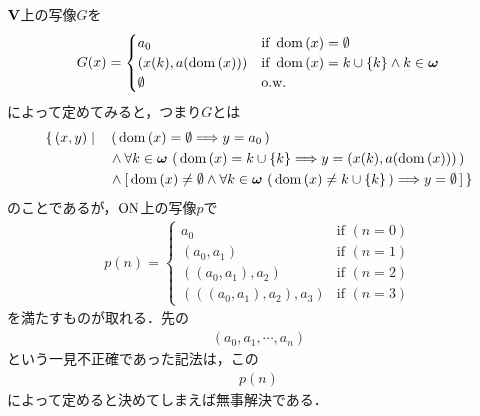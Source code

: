 		$\mathbf{V}$上の写像$G$を
		\begin{align}
			G(x) = 
			\begin{cases}
				a_0 & \mbox{if } \operatorname*{dom} \left(x\right) = \emptyset \\
				(x(k),a(\operatorname*{dom} \left(x\right))) & \mbox{if } \operatorname*{dom} \left(x\right) = k \cup \{k\} \wedge k \in {\boldsymbol \omega} \\
				\emptyset & \mbox{o.w.}
			\end{cases}
		\end{align}
		によって定めてみると，つまり$G$とは
		\begin{align}
			\{\, (x,y) \mid \quad &\left(\, \operatorname*{dom} \left(x\right) = \emptyset \Longrightarrow y = a_0\, \right) \\
		&\wedge \forall k \in {\boldsymbol \omega}\, \left(\, \operatorname*{dom} \left(x\right) = k \cup \{k\} \Longrightarrow y = (x(k),a(\operatorname*{dom} \left(x\right)))\, \right) \\
		&\wedge \left[\, \operatorname*{dom} \left(x\right) \neq \emptyset \wedge \forall k \in {\boldsymbol \omega}\, \left(\, \operatorname*{dom} \left(x\right) \neq k \cup \{k\}\, \right)
		\Longrightarrow y = \emptyset\, \right]\, \}
		\end{align}
		のことであるが，$\mathrm{ON}$上の写像$p$で
		\begin{align}
			p(n) =
			\begin{cases}
				a_0 & \mbox{if } (n = 0) \\
				(a_0,a_1) & \mbox{if } (n=1) \\
				((a_0,a_1),a_2) & \mbox{if } (n=2) \\
				(((a_0,a_1),a_2),a_3) & \mbox{if } (n=3)
			\end{cases}
		\end{align}
		を満たすものが取れる．先の
		\begin{align}
			(a_0,a_1,\cdots, a_n)
		\end{align}
		という一見不正確であった記法は，この
		\begin{align}
			p(n)
		\end{align}
		によって定めると決めてしまえば無事解決である．
	
